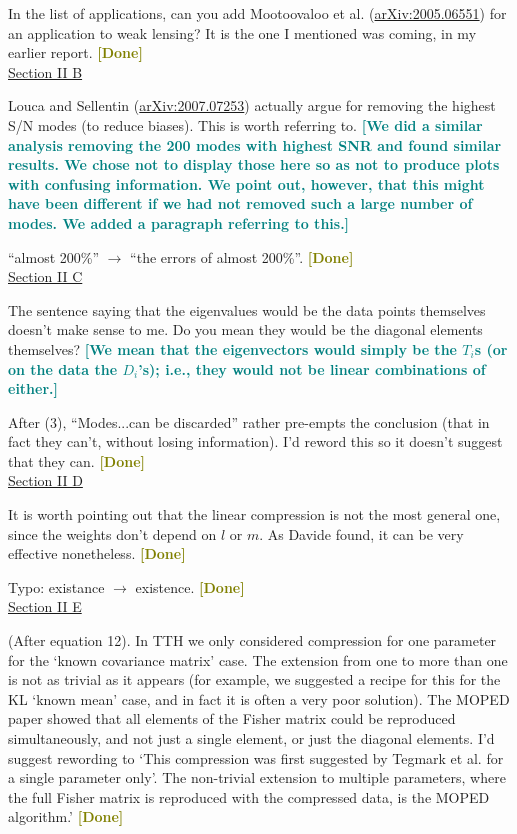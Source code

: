 \documentclass{article}
\newcommand\reply[1]{{\bf {\textcolor{teal}{[#1]}}}}
\newcommand\done{{\bf {\textcolor{olive}{[Done]}}}}
\begin{document}
    In the list of applications, can you add Mootoovaloo et al. (\href{https://arxiv.org/pdf/2005.06551.pdf}{arXiv:2005.06551}) for an application to weak lensing?  It is the one I mentioned was coming, in my earlier report. \done\\

    \underline{Section II B}
    
    Louca and Sellentin (\href{https://arxiv.org/pdf/2007.07253.pdf}{arXiv:2007.07253}) actually argue for removing the highest S/N modes (to reduce biases).  This is worth referring to. \reply{We did a similar analysis removing the 200 modes with highest SNR and found similar results. We chose not to display those here so as not to produce plots with confusing information. We point out, however, that this might have been different if we had not removed such a large number of modes. We added a paragraph referring to this.}

    “almost 200\%” $\rightarrow$ “the errors of almost 200\%”. \done\\

    \underline{Section II C}
    
    The sentence saying that the eigenvalues would be the data points themselves doesn’t make sense to me.  Do you mean they would be the diagonal elements themselves? \reply{We mean that the eigenvectors would simply be the $T_i$s (or on the data the $D_i$’s); i.e., they would not be linear combinations of either.}

    After (3), “Modes...can be discarded” rather pre-empts the conclusion (that in fact they can’t, without losing information).  I’d reword this so it doesn’t suggest that they can. \done\\

    \underline{Section II D}
    
    It is worth pointing out that the linear compression is not the most general one, since the weights don’t depend on $l$ or $m$.  As Davide found, it can be very effective nonetheless. \done

    Typo: existance $\rightarrow$ existence. \done\\

    \underline{Section II E}
    
    (After equation 12). In TTH we only considered compression for one parameter for the ‘known covariance matrix’ case.  The extension from one to more than one is not as trivial as it appears (for example, we suggested a recipe for this for the KL ‘known mean’ case, and in fact it is often a very poor solution).  The MOPED paper showed that all elements of the Fisher matrix could be reproduced simultaneously, and not just a single element, or just the diagonal elements.  I’d suggest rewording to ‘This compression was first suggested by Tegmark et al. for a single parameter only’.  The non-trivial extension to multiple parameters, where the full Fisher matrix is reproduced with the compressed data, is the MOPED algorithm.’ \done\\
    
\end{document}
